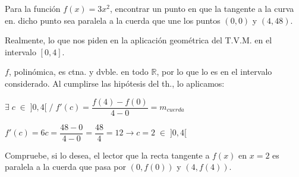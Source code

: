 	
	\begin{ejre} Para la función $f(x)=3x^2$, encontrar un punto en que la tangente a la curva en. dicho punto sea paralela a la cuerda que une los puntos $(0,0)$ y $(4,48)$.
		
	\end{ejre}
	\begin{proofw}\renewcommand{\qedsymbol}{$\diamond$}	
	
	Realmente, lo que nos piden en la aplicación geométrica del T.V.M. en el intervalo $[0,4]$.
	
	$f$, polinómica, es ctna. y dvble. en todo $\mathbb R$, por lo que lo es en el intervalo considerado. Al cumplirse las hipótesis del th., lo aplicamos:
	
	$\exists \; c\; \in \; ]0,4[ \; / \; f'(c)=\dfrac {f(4)-f(0)}{4-0}=m_{cuerda}$
	
	$f'(c)=6c=\dfrac {48-0}{4-0}=\dfrac {48}{4}= 12 \to c=2\; \in \; ]0,4[$
	
	\textcolor{gris}{Compruebe, si lo desea, el lector que la recta tangente a $f(x)$ en $x=2$ es paralela a la cuerda que pasa por $(0,f(0))$ y $(4,f(4))$.}
		
	\end{proofw}
	
